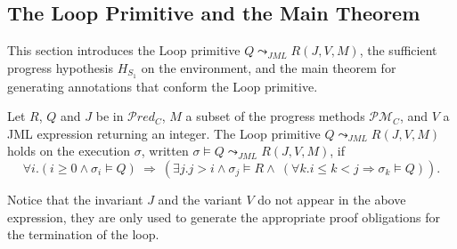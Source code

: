 \subsection{The \textsf{Loop} Primitive and the Main Theorem}%
\label{sec-until}

This section introduces
the  \textsf{Loop} primitive \(Q \leadsto_{\mathit{JML}} R (J,V,M)\), 
the sufficient progress hypothesis $H_{S_1}$ on the environment, and the
main theorem for generating annotations that conform the \textsf{Loop}
primitive. 

\begin{definition}\label{until1} 
  Let \(R\), \(Q\) and \(J\) be in $\mathcal{P}red_C$, \(M\) a subset of
  the progress methods $\mathcal{PM}_C$, and \(V\) a JML expression
  returning an integer.  The \textsf{Loop} primitive \(Q
  \leadsto_{\mathit{JML}} R 
  (J,V,M)\) holds on the execution $\sigma$, written $\sigma \models Q
  \leadsto_{\mathit{JML}} R (J,V,M)$, if
\[
\forall i. (i \geq 0
\wedge \sigma_i \models Q ) ~
\Rightarrow ~ (\exists j. j > i \wedge \sigma_j \models R \wedge
~(\forall k.i \leq k<j \Rightarrow \sigma_k \models Q )).
\]
\end{definition}
Notice that the
invariant \(J\) and the variant $V$ do not appear in the above
expression,%
they are only used to generate the appropriate proof obligations for
the termination of the loop.\\









